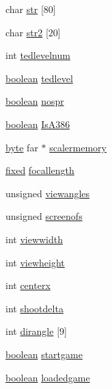 \begin{DoxyCompactItemize}
\item 
char \hyperlink{WL__DEF_8H_aaa970ecb4bbdf1eeaf97691045aaf8b5}{str} \mbox{[}80\mbox{]}
\item 
char \hyperlink{WL__DEF_8H_ab4ccbbd4c1a8a1618dcdfede0c63d313}{str2} \mbox{[}20\mbox{]}
\item 
int \hyperlink{WL__DEF_8H_aecad4308d4e4f895479ae314b36ecadb}{tedlevelnum}
\item 
\hyperlink{ID__HEAD_8H_a7c6368b321bd9acd0149b030bb8275ed}{boolean} \hyperlink{WL__DEF_8H_ae4f570f74d8fa87a5c00a8ebb38dbbd5}{tedlevel}
\item 
\hyperlink{ID__HEAD_8H_a7c6368b321bd9acd0149b030bb8275ed}{boolean} \hyperlink{WL__DEF_8H_a6910c9b4b0337ce17f4ea6c2260721bf}{nospr}
\item 
\hyperlink{ID__HEAD_8H_a7c6368b321bd9acd0149b030bb8275ed}{boolean} \hyperlink{WL__DEF_8H_ae705b06258eb47aefcfc554d1e2e0a3b}{IsA386}
\item 
\hyperlink{ID__HEAD_8H_a0c8186d9b9b7880309c27230bbb5e69d}{byte} far $\ast$ \hyperlink{WL__DEF_8H_aaf286380af29be7798468a08b72ceb01}{scalermemory}
\item 
\hyperlink{WL__DEF_8H_aaf54715c9b83afe8794059fcf5fd5e7e}{fixed} \hyperlink{WL__DEF_8H_a288677cce66771feddc15ea8cc5c36cc}{focallength}
\item 
unsigned \hyperlink{WL__DEF_8H_aace0a3e6e712c510e365a56600ae3cb1}{viewangles}
\item 
unsigned \hyperlink{WL__DEF_8H_abcc8c237b97739d0b0c39acc08dbf2fc}{screenofs}
\item 
int \hyperlink{WL__DEF_8H_a9d8a9239749c5174f26cf73ab9625c3b}{viewwidth}
\item 
int \hyperlink{WL__DEF_8H_abbbcb01b7dcc4679d07cde1acfbf1412}{viewheight}
\item 
int \hyperlink{WL__DEF_8H_a05f5f2b9130da8655f373530b17559f2}{centerx}
\item 
int \hyperlink{WL__DEF_8H_aa63bb3fda19e484f4cbc31ad1760f408}{shootdelta}
\item 
int \hyperlink{WL__DEF_8H_a3a80e8be3138f31dfac72bcf50a43d62}{dirangle} \mbox{[}9\mbox{]}
\item 
\hyperlink{ID__HEAD_8H_a7c6368b321bd9acd0149b030bb8275ed}{boolean} \hyperlink{WL__DEF_8H_abd09f97b0a5a9701196dba3f6e6c7978}{startgame}
\item 
\hyperlink{ID__HEAD_8H_a7c6368b321bd9acd0149b030bb8275ed}{boolean} \hyperlink{WL__DEF_8H_a2361eb57d882933d300f22fae83e8fa0}{loadedgame}
\item 

\end{DoxyCompactItemize}
